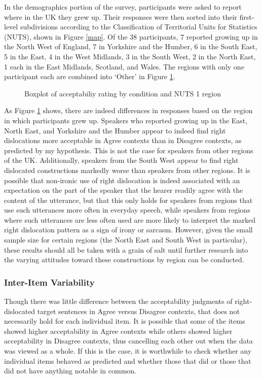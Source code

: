 \documentclass[titlepage,12pt]{article}
\begin{document}
In the demographics portion of the survey, participants were asked to report where in the UK they grew up. Their responses were then sorted into their first-level subdivisions according to the Classification of Territorial Units for Statistics (NUTS), shown in Figure \ref{map}. Of the 38 participants, 7 reported growing up in the North West of England, 7 in Yorkshire and the Humber, 6 in the South East, 5 in the East, 4 in the West Midlands, 3 in the South West, 2 in the North East, 1 each in the East Midlands, Scotland, and Wales. The regions with only one participant each are combined into `Other' in Figure \ref{byreg}. 

\begin{figure}[htb]
\centering
\noindent
{}
\caption{Boxplot of acceptabiliy rating by condition and NUTS 1 region}
\label{byreg}
\end{figure}

As Figure \ref{byreg} shows, there are indeed differences in responses based on the region in which participants grew up. Speakers who reported growing up in the East, North East, and Yorkshire and the Humber appear to indeed find right dislocations more acceptable in Agree contexts than in Disagree contexts, as predicted by my hypothesis. This is not the case for speakers from other regions of the UK. Additionally, speakers from the South West appear to find right dislocated constructions markedly worse than speakers from other regions. It is possible that non-ironic use of right dislocation is indeed associated with an expectation on the part of the speaker that the hearer readily agree with the content of the utterance, but that this only holds for speakers from regions that use such utterances more often in everyday speech, while speakers from regions where such utterances are less often used are more likely to interpret the marked right dislocation pattern as a sign of irony or sarcasm. 
However, given the small sample size for certain regions (the North East and South West in particular), these results should all be taken with a grain of salt until further research into the varying attitudes toward these constructions by region can be conducted.

\subsubsection{Inter-Item Variability}

Though there was little difference between the acceptability judgments of right-dislocated target sentences in Agree versus Disagree contexts, that does not necessarily hold for each individual item. It is possible that some of the items showed higher acceptability in Agree contexts while others showed higher acceptability in Disagree contexts, thus cancelling each other out when the data was viewed as a whole. If this is the case, it is worthwhile to check whether any individual items behaved as predicted and whether those that did or those that did not have anything notable in common.
\end{document}

